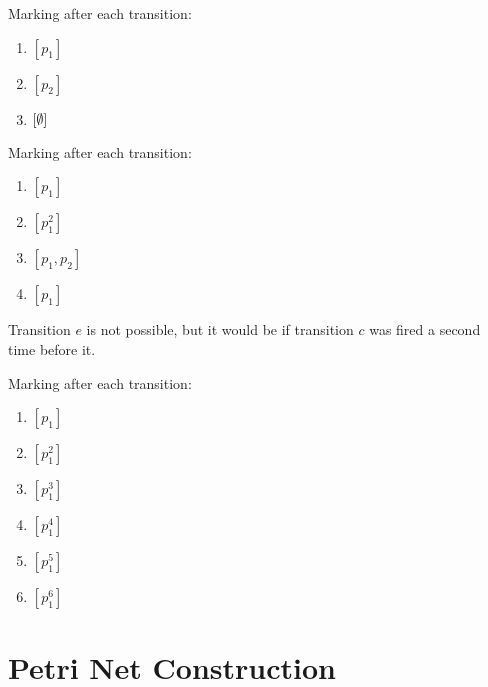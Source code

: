 \documentclass[a4paper]{report}
\begin{document}
Marking after each transition:
\begin{enumerate}
	\item $\left[ p_1\right] $
	\item $\left[ p_2\right] $
	\item $\left[ \emptyset\right] $
\end{enumerate}
Marking after each transition:
\begin{enumerate}
	\item $\left[ p_1\right] $
	\item $\left[ p_1^{2}\right] $
	\item $\left[ p_1,p_2\right] $
	\item $\left[ p_1\right] $
\end{enumerate}
Transition $e$ is not possible, but it would be if transition $c$ was fired a second time before it.

Marking after each transition:
\begin{enumerate}
	\item $\left[ p_1\right] $
	\item $\left[ p_1^{2}\right] $
	\item $\left[ p_1^{3}\right] $
	\item $\left[ p_1^{4}\right] $
	\item $\left[ p_1^{5}\right] $
	\item $\left[ p_1^{6}\right] $
\end{enumerate}

\section*{Petri Net Construction}

\end{document}
